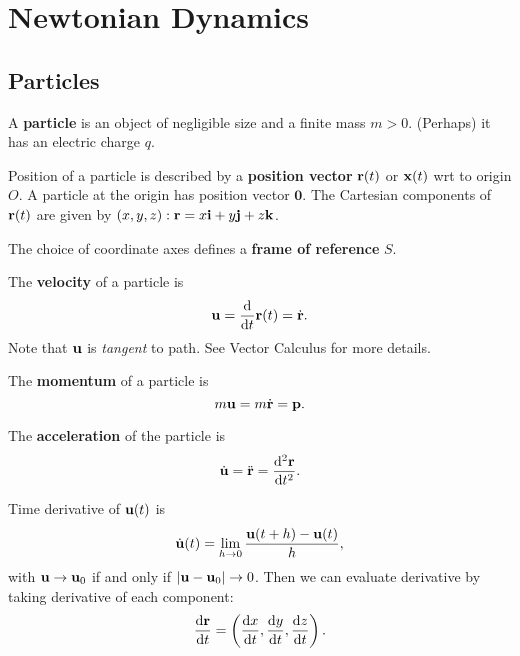 \section{Newtonian Dynamics}
\subsection{Particles}
\begin{definition}[Particle]
    A \textbf{particle} is an object of negligible size and a finite mass $m>0$. (Perhaps) it has an electric charge $q$. 
\end{definition}
\begin{definition}
    Position of a particle is described by a \textbf{position vector} ${\bf r}(t)$ or ${\bf x}(t)$ wrt to origin $O$. A particle at the origin has position vector $ \mathbf{0} $. The Cartesian components of ${\bf r}(t)$ are given by $(x,y,z): 
    \mathbf{r}= x {\bf i} + y{\bf j} + z{\bf k}$. 
\end{definition}
\begin{definition}
    The choice of coordinate axes defines a \textbf{frame of reference} $S$.
\end{definition}
\begin{definition}[Velocity]
    The \textbf{velocity} of a particle is 
    \[
        {\bf u} = \frac{\mathrm{d}}{\mathrm{d}t} {\bf r}(t) = \dot{{\bf r}}. 
    \]
    Note that $ {\bf u} $ is \textit{tangent} to path. See Vector Calculus for more details.
\end{definition}
\begin{definition}[Momentum]
    The \textbf{momentum} of a particle is 
    \[
        m{\bf u} = m \dot{{\bf r}} = {\bf p}.
    \]
\end{definition}
\begin{definition}[Acceleration]
    The \textbf{acceleration} of the particle is 
    \[
        \dot{{\bf u}}= \ddot{{\bf r}} = \frac{\mathrm{d}^2{\bf r}}{\mathrm{d}t^2}.
    \]
\end{definition}
\begin{note}
    Time derivative of ${\bf u}(t)$ is
    \[
        \dot{{\bf u}}(t) = \lim_{h \to 0} \frac{{\bf u}(t+h)-{\bf u}(t)}{h},
    \]
    with ${\bf u}\to{\bf u}_0$ if and only if $|{\bf u}-{\bf u}_0|\to 0$. Then we can evaluate derivative by taking derivative of each component:
    \[
        \frac{\mathrm{d}{\bf r}}{\mathrm{d}t} = \left( \frac{\mathrm{d}x}{\mathrm{d}t}, \frac{\mathrm{d}y}{\mathrm{d}t}, \frac{\mathrm{d}z}{\mathrm{d}t} \right). 
    \]
\end{note}
